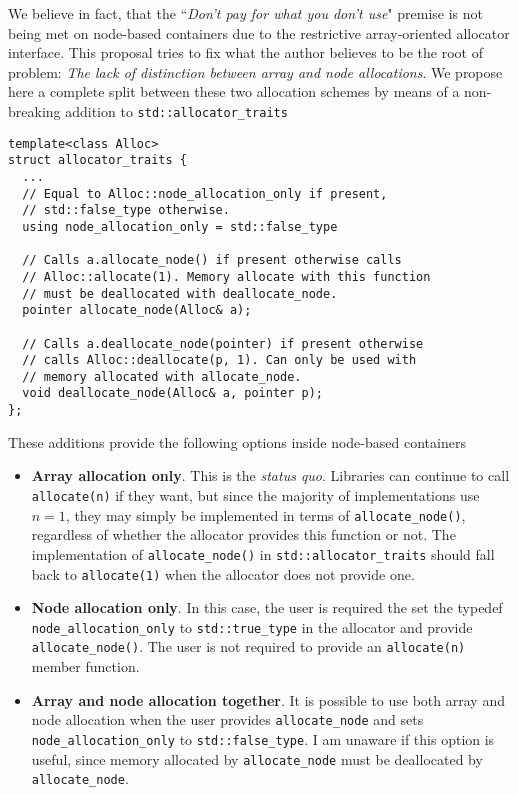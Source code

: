 \documentclass[11pt]{article}
\begin{document}
We believe in fact, that the ``{\it Don't pay for what you don't use}" premise
is not being met on node-based containers due to the restrictive
array-oriented allocator interface. This proposal tries to fix what the author
believes to be the root of problem: {\it The lack of distinction between array
and node allocations}.  We propose here a complete split between these two
allocation schemes by means of a non-breaking addition to
\texttt{std::allocator\_traits}
\medskip
\begin{lstlisting}
template<class Alloc>
struct allocator_traits {
  ...
  // Equal to Alloc::node_allocation_only if present,
  // std::false_type otherwise.
  using node_allocation_only = std::false_type

  // Calls a.allocate_node() if present otherwise calls
  // Alloc::allocate(1). Memory allocate with this function
  // must be deallocated with deallocate_node.
  pointer allocate_node(Alloc& a);

  // Calls a.deallocate_node(pointer) if present otherwise
  // calls Alloc::deallocate(p, 1). Can only be used with
  // memory allocated with allocate_node.
  void deallocate_node(Alloc& a, pointer p);
};
\end{lstlisting}
These additions provide the following options inside node-based
containers
\begin{itemize}
\item {\bf Array allocation only}.
This is the {\it status quo}. Libraries can continue to call
\texttt{allocate(n)} if they want, but since the majority of implementations
use $n = 1$, they may simply be implemented in terms of
\texttt{allocate\_node()}, regardless of whether the allocator provides this
function or not. The implementation of \texttt{allocate\_node()} in
\texttt{std::allocator\_traits} should fall back to \texttt{allocate(1)} 
when the allocator does not provide one.

\item {\bf Node allocation only}.
In this case, the user is required the set the typedef \texttt{node\_allocation\_only}
to \texttt{std::true\_type} in the allocator and provide \texttt{allocate\_node()}. The user is
not required to provide an \texttt{allocate(n)} member function.
\item {\bf Array and node allocation together}. It is possible to use
both array {and} node allocation when the user provides \texttt{allocate\_node}
and sets \texttt{node\_allocation\_only} to \texttt{std::false\_type}.
I am unaware if this option is useful, since memory allocated by
\texttt{allocate\_node} must be deallocated by \texttt{allocate\_node}.
\end{itemize}
\end{document}
